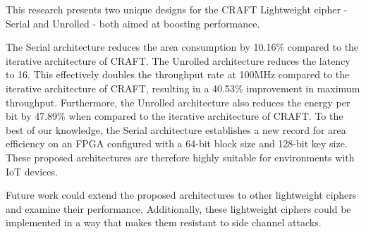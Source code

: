 \documentclass[final,5p,times,twocolumn]{elsarticle}
\begin{document}
This research presents two unique designs for the CRAFT Lightweight cipher - Serial and Unrolled - both aimed at boosting performance.

The Serial architecture reduces the area consumption by 10.16\% compared to the iterative architecture of CRAFT.
The Unrolled architecture reduces the latency to 16. This effectively doubles the throughput rate at 100MHz compared to the iterative architecture of CRAFT, resulting in a 40.53\% improvement in maximum throughput. Furthermore, the Unrolled architecture also reduces the energy per bit by 47.89\% when compared to the iterative architecture of CRAFT.
To the best of our knowledge, the Serial architecture establishes a new record for area efficiency on an FPGA configured with a 64-bit block size and 128-bit key size.
These proposed architectures are therefore highly suitable for environments with IoT devices.


Future work could extend the proposed architectures to other lightweight ciphers and examine their performance. Additionally, these lightweight ciphers could be implemented in a way that makes them resistant to side channel attacks.





\end{document}
